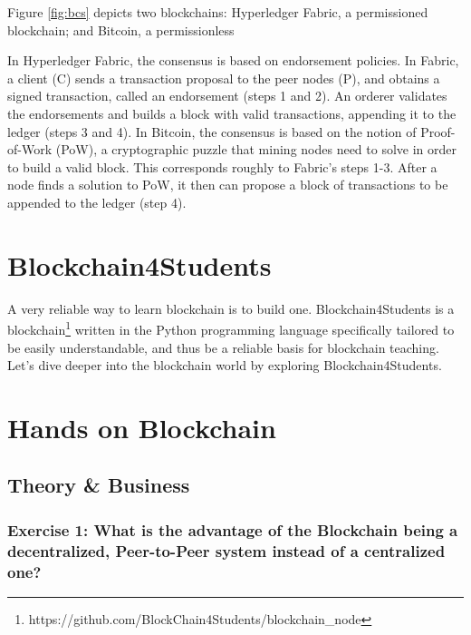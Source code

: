 \documentclass[12pt,a4paper]{article}
\theoremstyle{definition}
\begin{document}
Figure \ref{fig:bcs} depicts two blockchains: Hyperledger Fabric, a permissioned blockchain; and Bitcoin, a permissionless

In Hyperledger Fabric, the consensus is based on endorsement policies. In Fabric, a client (C) sends a transaction proposal to the peer nodes (P), and obtains a signed transaction, called an endorsement (steps 1 and 2). An orderer validates the endorsements and builds a block with valid transactions, appending it to the ledger (steps 3 and 4). In Bitcoin, the consensus is based on the notion of Proof-of-Work (PoW), a cryptographic puzzle that mining nodes need to solve in order to build a valid block. This corresponds roughly to Fabric’s steps 1-3. After a node finds a solution to PoW, it then can propose a block of transactions to be appended to the ledger (step 4).


\section{Blockchain4Students}
A very reliable way to learn blockchain is to build one. Blockchain4Students is a blockchain\footnote{https://github.com/BlockChain4Students/blockchain\_node} written in the Python programming language specifically tailored to be easily understandable, and thus be a reliable basis for blockchain teaching. Let's dive deeper into the blockchain world by exploring Blockchain4Students.


\section{Hands on Blockchain}



%


\subsection{Theory \& Business}


\subsubsection*{Exercise 1: What is the advantage of the Blockchain being a decentralized, Peer-to-Peer system instead of a centralized one?}
\end{document}
